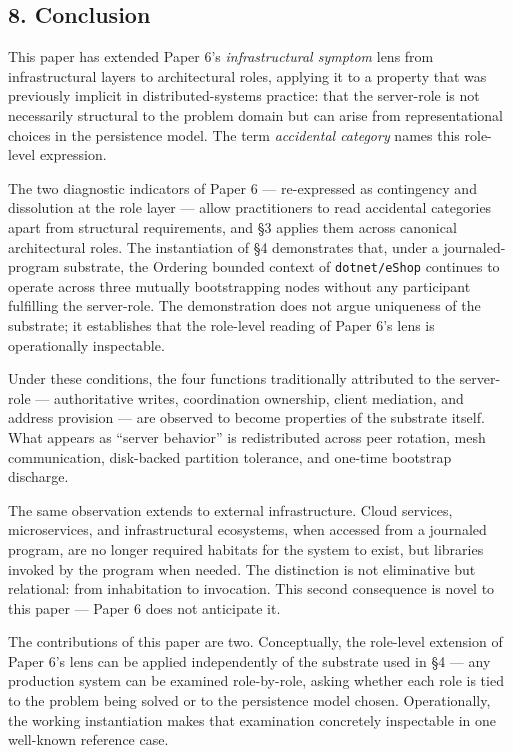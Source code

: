 \documentclass[
]{article}
\begin{document}
\subsection{8. Conclusion}\label{conclusion}

This paper has extended Paper 6's \emph{infrastructural symptom} lens
from infrastructural layers to architectural roles, applying it to a
property that was previously implicit in distributed-systems practice:
that the server-role is not necessarily structural to the problem domain
but can arise from representational choices in the persistence model.
The term \emph{accidental category} names this role-level expression.

The two diagnostic indicators of Paper 6 --- re-expressed as contingency
and dissolution at the role layer --- allow practitioners to read
accidental categories apart from structural requirements, and §3 applies
them across canonical architectural roles. The instantiation of §4
demonstrates that, under a journaled-program substrate, the Ordering
bounded context of \texttt{dotnet/eShop} continues to operate across
three mutually bootstrapping nodes without any participant fulfilling
the server-role. The demonstration does not argue uniqueness of the
substrate; it establishes that the role-level reading of Paper 6's lens
is operationally inspectable.

Under these conditions, the four functions traditionally attributed to
the server-role --- authoritative writes, coordination ownership, client
mediation, and address provision --- are observed to become properties
of the substrate itself. What appears as ``server behavior'' is
redistributed across peer rotation, mesh communication, disk-backed
partition tolerance, and one-time bootstrap discharge.

The same observation extends to external infrastructure. Cloud services,
microservices, and infrastructural ecosystems, when accessed from a
journaled program, are no longer required habitats for the system to
exist, but libraries invoked by the program when needed. The distinction
is not eliminative but relational: from inhabitation to invocation. This
second consequence is novel to this paper --- Paper 6 does not
anticipate it.

The contributions of this paper are two. Conceptually, the role-level
extension of Paper 6's lens can be applied independently of the
substrate used in §4 --- any production system can be examined
role-by-role, asking whether each role is tied to the problem being
solved or to the persistence model chosen. Operationally, the working
instantiation makes that examination concretely inspectable in one
well-known reference case.
\end{document}
